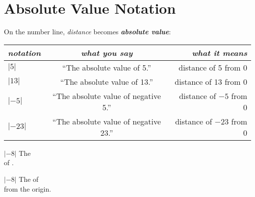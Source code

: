 
\section{Absolute Value Notation}

\begin{tcolorbox}[center,parbox=false,]
    On the number line, {\itshape distance} becomes {\bfseries\itshape absolute value}:\par
    \begin{center}
    \begin{tabular}{p{0.8in}cr}
        \toprule
        {\itshape notation} 
            & {\itshape what you say}
            & {\itshape what it means} \\
        \midrule
        $|5|$  
            & ``The absolute value of 5.''
            &  distance of 5 from 0 \\
        $|13|$  
            & ``The absolute value of 13.''
            &  distance of 13 from 0 \\
        $|-5|$  
            & ``The absolute value of {negative 5}.''
            &  distance of $-5$ from 0 \\
        $|-23|$  
        & ``The absolute value of {negative 23}.''
        &  distance of $-23$ from 0  \\
        \bottomrule
    \end{tabular}
    \end{center}
\end{tcolorbox}



{
    $|-8|$
    \tcblower 
    The  \\[0.75\baselineskip]
    of  .
}



{
    $|-8|$
    \tcblower
    The  of \\[0.75\baselineskip]
    from the origin.
}
